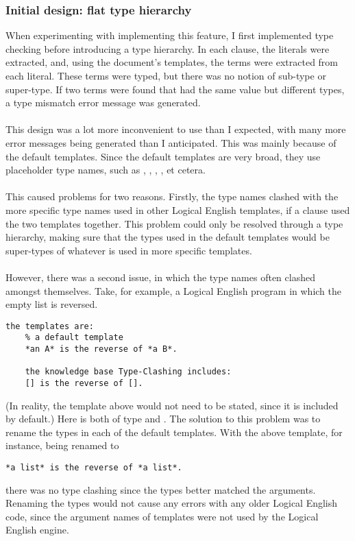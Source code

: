 \documentclass[../main.tex]{subfiles}
\begin{document}
\subsubsection{Initial design: flat type hierarchy}
When experimenting with implementing this feature, I first implemented type checking before introducing a type hierarchy. In each clause, the literals were extracted, and, using the document's templates, the terms were extracted from each literal. These terms were typed, but there was no notion of sub-type or super-type. If two terms were found that had the same value but different types, a type mismatch error message was generated.
\\ 
\\
This design was a lot more inconvenient to use than I expected, with many more error messages being generated than I anticipated. This was mainly because of the default templates. Since the default templates are very broad, they use placeholder type names, such as , , , , et cetera. 
\\
\\
This caused problems for two reasons. Firstly, the type names clashed with the more specific type names used in other Logical English templates, if a clause used the two templates together. This problem could only be resolved through a type hierarchy, making sure that the types used in the default templates would be super-types of whatever is used in more specific templates.
\\
\\
However, there was a second issue, in which the type names often clashed amongst themselves. Take, for example, a Logical English program in which the empty list is reversed.
\begin{lstlisting}[language={LE}]
    the templates are:
    % a default template
    *an A* is the reverse of *a B*. 
    
    the knowledge base Type-Clashing includes:
    [] is the reverse of [].
\end{lstlisting}
(In reality, the template above would not need to be stated, since it is included by default.) Here \codeword{[]]} is both of type  and .
The solution to this problem was to rename the types in each of the default templates. With the above template, for instance, being renamed to 
\begin{lstlisting}[language={LE}]
    *a list* is the reverse of *a list*.
\end{lstlisting}
there was no type clashing since the types better matched the arguments. Renaming the types would not cause any errors with any older Logical English code, since the argument names of templates were not used by the Logical English engine.
\end{document}
